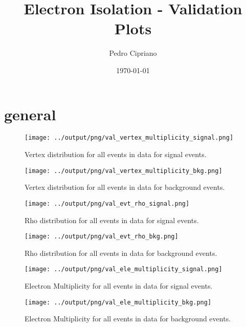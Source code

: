 \documentclass[11pt]{book}
\begin{document}
         
 
 \author{Pedro Cipriano}
 \date{\today}
 \title{Electron Isolation - Validation Plots}

\maketitle

\tableofcontents

\chapter{general}

\begin{figure}[htb]
\centering
\texttt{[image: ../output/png/val\_vertex\_multiplicity\_signal.png]}
\caption{Vertex distribution for all events in data for signal events.}
\label{fig:val_vertex_multiplicity_signal}
\end{figure}

\begin{figure}[htb]
\centering
\texttt{[image: ../output/png/val\_vertex\_multiplicity\_bkg.png]}
\caption{Vertex distribution for all events in data for background events.}
\label{fig:val_vertex_multiplicity_bkg}
\end{figure}

\begin{figure}[htb]
\centering
\texttt{[image: ../output/png/val\_evt\_rho\_signal.png]}
\caption{Rho distribution for all events in data for signal events.}
\label{fig:val_evt_rho_signal}
\end{figure}

\begin{figure}[htb]
\centering
\texttt{[image: ../output/png/val\_evt\_rho\_bkg.png]}
\caption{Rho distribution for all events in data for background events.}
\label{fig:val_evt_rho_bkg}
\end{figure}


\begin{figure}[htb]
\centering
\texttt{[image: ../output/png/val\_ele\_multiplicity\_signal.png]}
\caption{Electron Multiplicity for all events in data for signal events.}
\label{fig:val_ele_multiplicity_signal}
\end{figure}

\begin{figure}[htb]
\centering
\texttt{[image: ../output/png/val\_ele\_multiplicity\_bkg.png]}
\caption{Electron Multiplicity for all events in data for background events.}
\label{fig:val_ele_multiplicity_bkg}
\end{figure}
\end{document}

